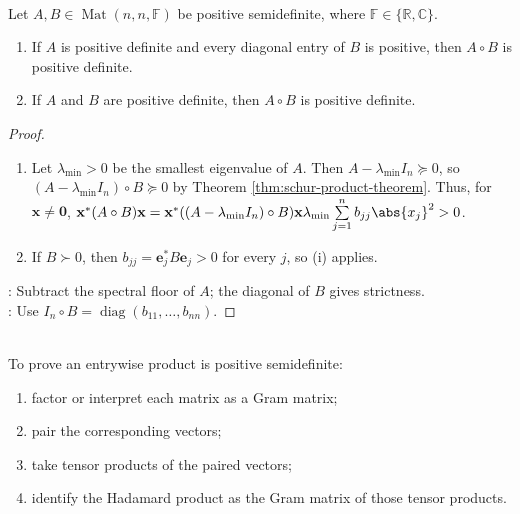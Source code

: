 \begin{corollary} \label{cor:hadamard-positive-definite-criterion} \\
Let $A,B\in\operatorname{Mat}(n,n,\mathbb{F})$ be positive semidefinite, where $\mathbb{F}\in\{\mathbb{R},\mathbb{C}\}$.
\begin{enumerate}[label=(\roman*)]
\setlength{\itemsep}{0pt}
\item If $A$ is positive definite and every diagonal entry of $B$ is positive, then $A\circ B$ is positive definite.
\item If $A$ and $B$ are positive definite, then $A\circ B$ is positive definite.
\end{enumerate}
\begin{proof}
\begin{enumerate}[label=(\roman*)]
\setlength{\itemsep}{0pt}
\item Let $\lambda_{\min}>0$ be the smallest eigenvalue of $A$. Then $A-\lambda_{\min}I_n\succeq0$, so $(A-\lambda_{\min}I_n)\circ B\succeq0$ by Theorem \ref{thm:schur-product-theorem}. Thus, for $\mathbf{x}\neq\mathbf{0}$, $\mathbf{x}^*(A\circ B)\mathbf{x} =\mathbf{x}^*((A-\lambda_{\min}I_n)\circ B)\mathbf{x} \lambda_{\min}\sum\limits_{j=1}^{n}b_{jj}\abs{x_j}^2>0$.
\item If $B\succ0$, then $b_{jj}=\mathbf{e}_j^*B\mathbf{e}_j>0$ for every $j$, so (i) applies.
\end{enumerate}
: Subtract the spectral floor of $A$; the diagonal of $B$ gives strictness.\\
: Use $I_n\circ B=\operatorname{diag}(b_{11},\ldots,b_{nn})$.
\end{proof}
\end{corollary}

\begin{method} \label{meth:schur-product-positivity} \\
To prove an entrywise product is positive semidefinite:
\begin{enumerate}[label=(\roman*)]
\setlength{\itemsep}{0pt}
\item factor or interpret each matrix as a Gram matrix;
\item pair the corresponding vectors;
\item take tensor products of the paired vectors;
\item identify the Hadamard product as the Gram matrix of those tensor products.
\end{enumerate}
\end{method}


